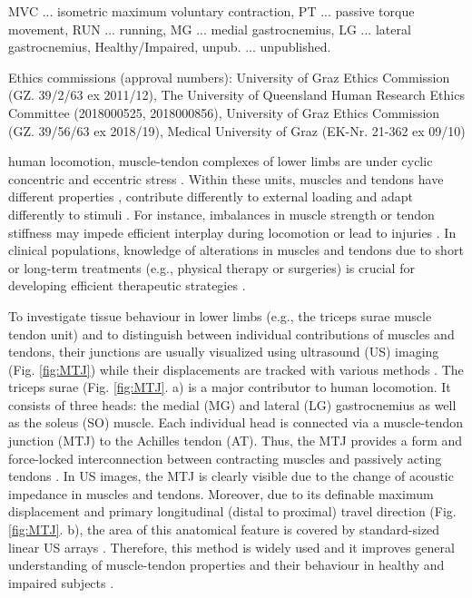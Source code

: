 \documentclass[journal,twoside,web]{ieeecolor}
\begin{document}
\begin{table*}[ht!]
\begin{center}
\begin{tabular}{cccccccccccc}
    \end{tabular}
    \end{center}
    \begin{tablenotes}
        \item MVC ... isometric maximum voluntary contraction, PT ... passive torque movement, RUN ... running, MG ... medial gastrocnemius, LG ... lateral gastrocnemius,  Healthy/Impaired, unpub. ... unpublished.
        \item Ethics commissions (approval numbers): University of Graz Ethics Commission (GZ. 39/2/63 ex 2011/12), The University of Queensland Human Research Ethics Committee (2018000525, 2018000856), University of Graz Ethics Commission (GZ. 39/56/63 ex 2018/19), Medical University of Graz (EK-Nr. 21-362 ex 09/10)
    \end{tablenotes}
    \vspace{-0.3cm}
\end{table*}
%
  human locomotion, muscle-tendon complexes of lower limbs are under cyclic concentric and eccentric stress \cite{j:Komi2000}. Within these units, muscles and tendons have different properties \cite{j:Alexander1991}, contribute differently to external loading \cite{j:Lichtwark2006} and adapt differently to stimuli \cite{j:Magnusson2008}. For instance, imbalances in muscle strength or tendon stiffness may impede efficient interplay during locomotion \cite{j:Roberts1997} or lead to injuries \cite{j:Arampatzis2020}. In clinical populations, knowledge of alterations in muscles and tendons due to short or long-term treatments (e.g., physical therapy or surgeries) is crucial for developing efficient therapeutic strategies \cite{j:Hoesl2020}.

To investigate tissue behaviour in lower limbs (e.g., the triceps surae muscle tendon unit) and to distinguish between individual contributions of muscles and tendons, their junctions are usually visualized using ultrasound (US) imaging (Fig. \ref{fig:MTJ}) while their displacements are tracked with various methods \cite{j:Lee2008, j:Zhou2018, j:Cenni2019, c:LeitnerJarolim2020, j:Krupenevich2021}. The triceps surae (Fig. \ref{fig:MTJ}. a) is a major contributor to human locomotion. It consists of three heads: the medial (MG) and lateral (LG) gastrocnemius as well as the soleus (SO) muscle. Each individual head is connected via a muscle-tendon junction (MTJ) to the Achilles tendon (AT). Thus, the MTJ provides a form and force-locked interconnection between contracting muscles and passively acting tendons \cite{j:Charvet2012}. In US images, the MTJ is clearly visible due to the change of acoustic impedance in muscles and tendons. Moreover, due to its definable maximum displacement and primary longitudinal (distal to proximal) travel direction (Fig. \ref{fig:MTJ}. b), the area of this anatomical feature is covered by standard-sized linear US arrays \cite{j:Leitner2019}. Therefore, this method is widely used and it improves general understanding of muscle-tendon properties and their behaviour in healthy \cite{j:Werkhausen2018} and impaired subjects \cite{j:Barber2017, j:Cenni2019}.
\end{document}
